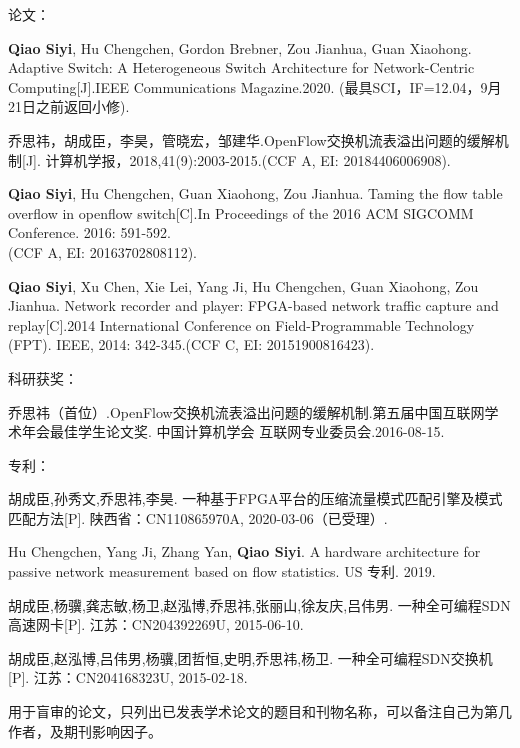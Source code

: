 
{}




\noindent 论文：
\begin{publist}
	\item \textbf{Qiao Siyi}, Hu Chengchen, Gordon Brebner, Zou Jianhua, Guan Xiaohong. Adaptive Switch: A Heterogeneous Switch Architecture for Network-Centric Computing[J].IEEE Communications Magazine.2020.
	(最具SCI，IF=12.04，9月21日之前返回小修).
	\item {\hei 乔思祎}，胡成臣，李昊，管晓宏，邹建华.OpenFlow交换机流表溢出问题的缓解机制[J]. 计算机学报，2018,41(9):2003-2015.(CCF A, EI: 20184406006908).
	\item \textbf{Qiao Siyi}, Hu Chengchen, Guan Xiaohong, Zou Jianhua. Taming the flow table overflow in openflow switch[C].In Proceedings of the 2016 ACM SIGCOMM Conference. 2016: 591-592.\\
	(CCF A, EI: 20163702808112).
	\item \textbf{Qiao Siyi}, Xu Chen, Xie Lei, Yang Ji, Hu Chengchen, Guan Xiaohong, Zou Jianhua. Network recorder and player: FPGA-based network traffic capture and replay[C].2014 International Conference on Field-Programmable Technology (FPT). IEEE, 2014: 342-345.(CCF C, EI: 20151900816423).
\end{publist}

\noindent 科研获奖：
\begin{publist}
	\item {\hei 乔思祎}（首位）.OpenFlow交换机流表溢出问题的缓解机制.第五届中国互联网学术年会最佳学生论文奖. 中国计算机学会 互联网专业委员会.2016-08-15.
\end{publist}

\noindent 专利：
\begin{publist}
	
	\item 胡成臣,孙秀文,{\hei 乔思祎},李昊. 一种基于FPGA平台的压缩流量模式匹配引擎及模式匹配方法[P]. 陕西省：CN110865970A, 2020-03-06（已受理）.
	\item Hu Chengchen, Yang Ji, Zhang Yan, \textbf{Qiao Siyi}. A hardware architecture for passive network measurement based on flow statistics. US 专利. 2019.
	\item 胡成臣,杨骥,龚志敏,杨卫,赵泓博,{\hei 乔思祎},张丽山,徐友庆,吕伟男. 一种全可编程SDN高速网卡[P]. 江苏：CN204392269U, 2015-06-10. 
	\item 胡成臣,赵泓博,吕伟男,杨骥,团哲恒,史明,{\hei 乔思祎},杨卫. 一种全可编程SDN交换机[P]. 江苏：CN204168323U, 2015-02-18.
\end{publist}






\vspace{\baselineskip}
{\color{red} 用于盲审的论文，只列出已发表学术论文的题目和刊物名称，可以备注自己为第几作者，及期刊影响因子。}

\clearpage{\pagestyle{empty}\cleardoublepage}%
